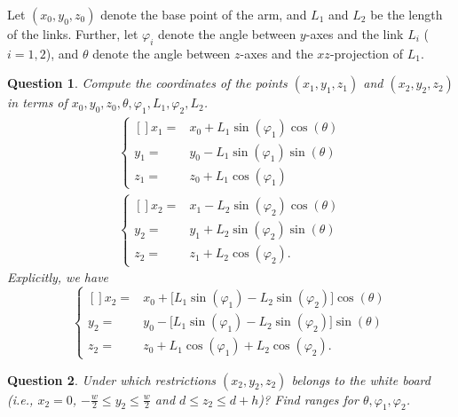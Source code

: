\documentclass{article}
\newtheorem{question}{Question}
\begin{document}
Let $(x_{0},y_{0},z_{0})$ denote the base point of the arm,
and $L_{1}$ and $L_{2}$ be the length of the links.
Further, let $\varphi_{i}$ denote the angle between $y$-axes and the link $L_{i}$ ($i=1,2$),
and $\theta$ denote the angle between $z$-axes and the $xz$-projection of $L_{1}$.

\begin{question}
Compute the coordinates of the points $(x_{1},y_{1},z_{1})$ and $(x_{2},y_{2},z_{2})$ in terms of $x_{0},y_{0},z_{0},\theta,\varphi_{1},L_{1},\varphi_{2},L_{2}$.
\begin{align}
\left\{
\begin{aligned}[]
x_{1}={}&x_{0}+L_{1}\sin(\varphi_{1})\cos(\theta)\\
y_{1}={}&y_{0}-L_{1}\sin(\varphi_{1})\sin(\theta)\\
z_{1}={}&z_{0}+L_{1}\cos(\varphi_{1})
\end{aligned}
\right.\nonumber\\
\left\{
\begin{aligned}[]
x_{2}={}&x_{1}-L_{2}\sin(\varphi_{2})\cos(\theta)\\
y_{2}={}&y_{1}+L_{2}\sin(\varphi_{2})\sin(\theta)\\
z_{2}={}&z_{1}+L_{2}\cos(\varphi_{2}).
\end{aligned}\right.\nonumber
\end{align}
Explicitly, we have
\begin{equation}
\left\{
\begin{aligned}[]
x_{2}={}&x_{0}+\bigl[L_{1}\sin(\varphi_{1})-L_{2}\sin(\varphi_{2})\bigr]\cos(\theta)\\
y_{2}={}&y_{0}-\bigl[L_{1}\sin(\varphi_{1})-L_{2}\sin(\varphi_{2})\bigr]\sin(\theta)\\
z_{2}={}&z_{0}+L_{1}\cos(\varphi_{1})+L_{2}\cos(\varphi_{2}).
\end{aligned}\right.\nonumber
\end{equation}
\end{question}


\begin{question}
Under which restrictions $(x_{2},y_{2},z_{2})$ belongs to the white board
(i.e., $x_{2}=0$, $-\frac{w}{2}\leq{}y_{2}\leq\frac{w}{2}$ and $d\leq{}z_{2}\leq{}d+h$)?
Find ranges for $\theta,\varphi_{1},\varphi_{2}$.
\end{question}
\end{document}
